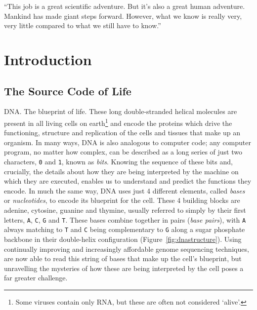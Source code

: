 \cleartorightpage
\begin{savequote}[75mm]
``This job is a great scientific adventure. But it's also a great human adventure. Mankind has made giant steps forward. However, what we know is really very, very little compared to what we still have to know.''
\end{savequote}


\chapter{Introduction}\label{introduction}
\setcounter{figure}{-1}
\setcounter{table}{-1}
\setcounter{section}{-1}
\setcounter{NAT@ctr}{-1}

\setlength\parindent{0pt}

\begin{justify}

\section{The Source Code of Life}

DNA\@. The blueprint of life. These long double-stranded helical molecules are present in all living cells on earth\footnote{Some viruses contain only RNA, but these are often not considered `alive'.} and encode the proteins which drive the functioning, structure and replication of the cells and tissues that make up an organism. In many ways, DNA is also analogous to computer code; any computer program, no matter how complex, can be described as a long series of just two characters, \verb+0+ and \verb+1+, known as \emph{bits}. Knowing the sequence of these bits and, crucially, the details about how they are being interpreted by the machine on which they are executed, enables us to understand and predict the functions they encode. In much the same way, DNA uses just 4 different elements, called \emph{bases} or \emph{nucleotides}, to encode its blueprint for the cell. These 4 building blocks are adenine, cytosine, guanine and thymine, usually referred to simply by their first letters, \verb+A+, \verb+C+, \verb+G+ and \verb+T+. These bases combine together in pairs (\emph{base pairs}), with \verb+A+ always matching to \verb+T+ and \verb+C+ being complementary to \verb+G+ along a sugar phosphate backbone in their double-helix configuration (Figure~\ref{fig:dnastructure}). Using continually improving and increasingly affordable genome sequencing techniques, are now able to read this string of bases that make up the cell's blueprint, but unravelling the mysteries of how these are being interpreted by the cell poses a far greater challenge.

\end{justify}


